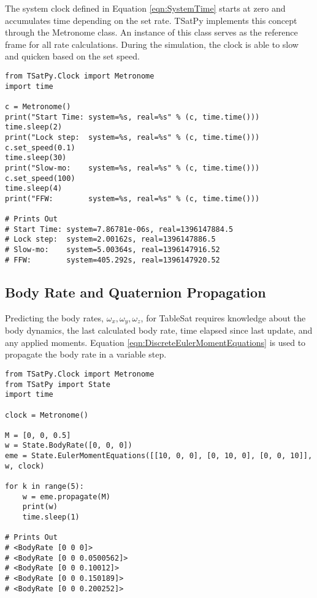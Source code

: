 The system clock defined in Equation \ref{eqn:SystemTime} starts at zero and accumulates time depending on the set rate.  TSatPy implements this concept through the Metronome class.  An instance of this class serves as the reference frame for all rate calculations.  During the simulation, the clock is able to slow and quicken based on the set speed.

\begin{singlespace}
  \begin{verbatim}
from TSatPy.Clock import Metronome
import time

c = Metronome()
print("Start Time: system=%s, real=%s" % (c, time.time()))
time.sleep(2)
print("Lock step:  system=%s, real=%s" % (c, time.time()))
c.set_speed(0.1)
time.sleep(30)
print("Slow-mo:    system=%s, real=%s" % (c, time.time()))
c.set_speed(100)
time.sleep(4)
print("FFW:        system=%s, real=%s" % (c, time.time()))

# Prints Out
# Start Time: system=7.86781e-06s, real=1396147884.5
# Lock step:  system=2.00162s, real=1396147886.5
# Slow-mo:    system=5.00364s, real=1396147916.52
# FFW:        system=405.292s, real=1396147920.52
  \end{verbatim}
  \nocite{minted}
\end{singlespace}


\subsection{Body Rate and Quaternion Propagation}
\label{subsec:BodyRateQuaternionPropagation}

Predicting the body rates, $\omega_x, \omega_y, \omega_z$, for TableSat requires knowledge about the body dynamics, the last calculated body rate, time elapsed since last update, and any applied moments.  Equation \ref{eqn:DiscreteEulerMomentEquations} is used to propagate the body rate in a variable step.

\begin{singlespace}
  \begin{verbatim}
from TSatPy.Clock import Metronome
from TSatPy import State
import time

clock = Metronome()

M = [0, 0, 0.5]
w = State.BodyRate([0, 0, 0])
eme = State.EulerMomentEquations([[10, 0, 0], [0, 10, 0], [0, 0, 10]], w, clock)

for k in range(5):
    w = eme.propagate(M)
    print(w)
    time.sleep(1)

# Prints Out
# <BodyRate [0 0 0]>
# <BodyRate [0 0 0.0500562]>
# <BodyRate [0 0 0.10012]>
# <BodyRate [0 0 0.150189]>
# <BodyRate [0 0 0.200252]>
  \end{verbatim}
\nocite{minted}
\end{singlespace}

